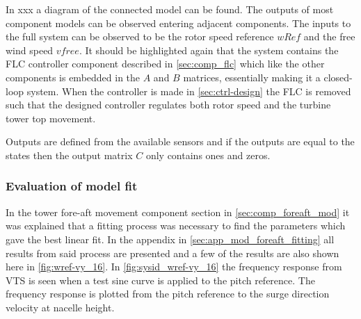 In xxx a diagram of the connected model can be found. The outputs of most component models can be observed entering adjacent components. The inputs to the full system can be observed to be the rotor speed reference $ wRef $ and the free wind speed $ vfree $. It should be highlighted again that the system contains the FLC controller component described in \cref{sec:comp_flc} which like the other components is embedded in the $ A $ and $ B $ matrices, essentially making it a closed-loop system. When the controller is made in \cref{sec:ctrl-design} the FLC is removed such that the designed controller regulates both rotor speed and the turbine tower top movement.

Outputs are defined from the available sensors and if the outputs are equal to the states then the output matrix $ C $ only contains ones and zeros.

\subsubsection{Evaluation of model fit} \label{sec:lin_fit_eval}
In the tower fore-aft movement component section in \cref{sec:comp_foreaft_mod} it was explained that a fitting process was necessary to find the parameters which gave the best linear fit. In the appendix in \cref{sec:app_mod_foreaft_fitting} all results from said process are presented and a few of the results are also shown here in \cref{fig:wref-vy_16}. In \cref{fig:sysid_wref-vy_16} the frequency response from VTS is seen when a test sine curve is applied to the pitch reference. The frequency response is plotted from the pitch reference to the surge direction velocity at nacelle height.

